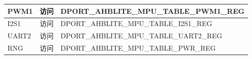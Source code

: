 \begin{longtable}[c]{|p{4cm}|p{2cm}|p{9cm}|}
    
    PWM1                  & 访问 & DPORT\_AHBLITE\_MPU\_TABLE\_PWM1\_REG \\
    \hline
    I2S1                  & 访问 & DPORT\_AHBLITE\_MPU\_TABLE\_I2S1\_REG \\
    \hline
    UART2                 & 访问 & DPORT\_AHBLITE\_MPU\_TABLE\_UART2\_REG \\
    \hline
    
    
    RNG               & 访问 & DPORT\_AHBLITE\_MPU\_TABLE\_PWR\_REG \\
    
\end{longtable}
